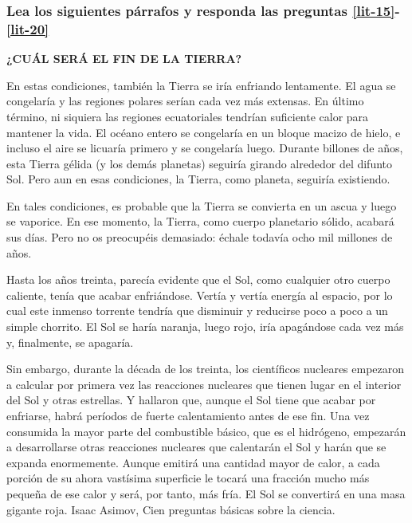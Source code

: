 \begin{enumerate}

\subsubsection*{Lea los siguientes párrafos y responda las preguntas \ref{lit-15}-\ref{lit-20}}

\begin{center}
\textbf{¿CUÁL SERÁ EL FIN DE LA TIERRA?	}
\end{center}

 
En estas condiciones, también la Tierra se iría enfriando lentamente. El agua se congelaría y las regiones polares serían cada vez más extensas. En último término, ni siquiera las regiones ecuatoriales tendrían suficiente calor para mantener la vida.  El océano entero se congelaría en un bloque macizo de hielo, e incluso el aire se licuaría primero y se congelaría luego. Durante billones de años, esta Tierra gélida (y los demás planetas) seguiría girando alrededor del difunto Sol. Pero aun en esas condiciones, la Tierra, como planeta, seguiría existiendo.


 En tales condiciones, es probable que la Tierra se convierta en un ascua y luego se vaporice. En ese momento, la Tierra, como cuerpo planetario sólido, acabará sus días. Pero no os preocupéis demasiado: échale todavía ocho mil millones de años.


Hasta los años treinta, parecía evidente que el Sol, como cualquier otro cuerpo caliente, tenía que acabar enfriándose. Vertía y vertía energía al espacio, por lo cual este inmenso torrente tendría que disminuir y reducirse poco a poco a un simple chorrito. El Sol se haría naranja, luego rojo, iría apagándose cada vez más y, finalmente, se apagaría.	


 Sin embargo, durante la década de los treinta, los científicos nucleares empezaron a calcular por primera vez las reacciones nucleares que tienen lugar en el interior del Sol y otras estrellas. Y hallaron que, aunque el Sol tiene que acabar por enfriarse, habrá períodos de fuerte calentamiento antes de ese fin. Una vez consumida la mayor parte del combustible básico, que es el hidrógeno, empezarán a desarrollarse otras reacciones nucleares que calentarán el Sol y harán que se expanda enormemente. Aunque emitirá una cantidad mayor de calor, a cada porción de su ahora vastísima superficie le tocará una fracción mucho más pequeña de ese calor y será, por tanto, más fría.  El Sol se convertirá en una masa gigante roja. 
Isaac Asimov, Cien preguntas básicas sobre la ciencia.  


\end{enumerate}

